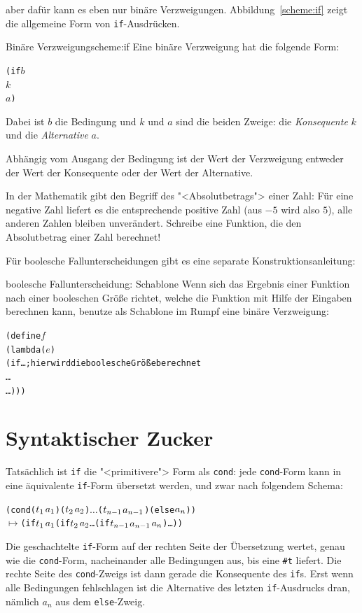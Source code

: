aber dafür kann es eben nur binäre Verzweigungen.
Abbildung~\ref{scheme:if} zeigt die allgemeine Form von
\texttt{if}-Ausdrücken.
\begin{feature}{Binäre Verzweigung}{scheme:if}
  Eine binäre Verzweigung hat die folgende Form:
\begin{alltt}
(if \(b\)
    \(k\)
    \(a\))
\end{alltt}
Dabei ist $b$ die Bedingung und $k$ und $a$ sind die
beiden Zweige: die \textit{Konsequente} $k$ und die
\textit{Alternative} $a$.

Abhängig vom Ausgang der
Bedingung ist der Wert der Verzweigung entweder der Wert der Konsequente
oder der Wert der Alternative.
\end{feature}
%
\begin{aufgabe}
  In der Mathematik gibt den Begriff des "<Absolutbetrags"> einer
  Zahl: Für eine negative Zahl liefert es die entsprechende positive
  Zahl (aus $-5$ wird also $5$), alle anderen Zahlen bleiben
  unverändert.  Schreibe eine Funktion, die den Absolutbetrag einer
  Zahl berechnet!
\end{aufgabe}
%
Für boolesche Fallunterscheidungen gibt es eine separate
Konstruktionsanleitung:
%
\begin{konstruktionsanleitung}{boolesche Fallunterscheidung: Schablone}
  \label{ka:boolesche-fallunterscheidung}
  Wenn sich das Ergebnis einer Funktion nach einer booleschen Größe
  richtet, welche die Funktion mit Hilfe der Eingaben berechnen kann,
  benutze als Schablone im Rumpf eine binäre Verzweigung:
\begin{alltt}
(define \(f\)
  (lambda (\(e\))
    (if \ldots ; \textrm{hier wird die boolesche Größe berechnet}
        \ldots
        \ldots)))
\end{alltt}
\end{konstruktionsanleitung}

\section{Syntaktischer Zucker}

Tatsächlich ist \texttt{if} die "<primitivere"> Form als
\texttt{cond}: jede \texttt{cond}-Form kann in eine äquivalente
\texttt{if}-Form übersetzt werden, und zwar nach
folgendem Schema:
%
\begin{alltt}
(cond (\(t\sb{1}\) \(a\sb{1}\)) (\(t\sb{2}\) \(a\sb{2}\)) \(\ldots\) (\(t\sb{n-1}\) \(a\sb{n-1}\)) (else \(a\sb{n}\)))
  \(\mapsto\) (if \(t\sb{1}\) \(a\sb{1}\) (if \(t\sb{2}\) \(a\sb{2}\) \ldots (if \(t\sb{n-1}\) \(a\sb{n-1}\) \(a\sb{n}\))\ldots))
\end{alltt}
%
Die geschachtelte \texttt{if}-Form auf der rechten Seite der
Übersetzung wertet, genau wie die \texttt{cond}-Form, nacheinander
alle Bedingungen aus, bis eine \verb|#t| liefert.  Die rechte Seite des
\texttt{cond}-Zweigs ist dann gerade die Konsequente des \texttt{if}s.
Erst wenn alle Bedingungen fehlschlagen ist die Alternative des letzten
\texttt{if}-Ausdrucks dran, nämlich $a_n$ aus dem \texttt{else}-Zweig.

